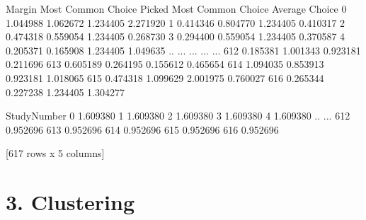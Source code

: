 \documentclass[letterpaper,10pt,english]{jupyterBook}
\begin{document}
\begin{sphinxVerbatim}[commandchars=\\\{\}]
       Margin  Most Common Choice Picked  Most Common Choice  Average Choice  \PYGZbs{}
0    1.044988                   1.062672            1.234405        2.271920   
1   \PYGZhy{}0.414346                  \PYGZhy{}0.804770            1.234405       \PYGZhy{}0.410317   
2   \PYGZhy{}0.474318                  \PYGZhy{}0.559054            1.234405        0.268730   
3   \PYGZhy{}0.294400                  \PYGZhy{}0.559054            1.234405        0.370587   
4    0.205371                  \PYGZhy{}0.165908            1.234405        1.049635   
..        ...                        ...                 ...             ...   
612  0.185381                  \PYGZhy{}1.001343           \PYGZhy{}0.923181       \PYGZhy{}0.211696   
613  0.605189                  \PYGZhy{}0.264195            0.155612        0.465654   
614 \PYGZhy{}1.094035                  \PYGZhy{}0.853913           \PYGZhy{}0.923181       \PYGZhy{}1.018065   
615 \PYGZhy{}0.474318                  \PYGZhy{}1.099629           \PYGZhy{}2.001975       \PYGZhy{}0.760027   
616  0.265344                   0.227238            1.234405        1.304277   

     StudyNumber  
0      \PYGZhy{}1.609380  
1      \PYGZhy{}1.609380  
2      \PYGZhy{}1.609380  
3      \PYGZhy{}1.609380  
4      \PYGZhy{}1.609380  
..           ...  
612     0.952696  
613     0.952696  
614     0.952696  
615     0.952696  
616     0.952696  

[617 rows x 5 columns]
\end{sphinxVerbatim}

\begin{sphinxVerbatim}[commandchars=\\\{\}]
\end{sphinxVerbatim}


\chapter{3. Clustering}
\label{\detokenize{clustering:clustering}}\label{\detokenize{clustering::doc}}
\end{document}
